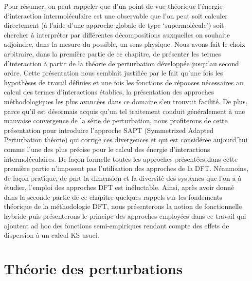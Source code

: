  
Pour résumer, on peut rappeler que d’un point de vue théorique l’énergie d’interaction intermoléculaire est une observable que l’on peut soit calculer directement (à l’aide d’une approche globale de type ‘supermolécule’) soit chercher à interpréter par différentes décompositions auxquelles on souhaite adjoindre, dans la mesure du possible, un sens physique. Nous avons fait le choix arbitraire, dans la première partie de ce chapitre, de présenter les termes d’interaction à partir de la théorie de perturbation développée jusqu’au second ordre. Cette présentation nous semblait justifiée par le fait qu’une fois les hypothèses de travail définies et une fois les fonctions de réponses nécessaires au calcul des termes d’interactions établies, la présentation des approches méthodologiques les plus avancées dans ce domaine s’en trouvait facilité. De plus, parce qu’il est désormais acquis qu’un tel traitement conduit généralement à une mauvaise convergence de la série de perturbation, nous profiterons de cette présentation pour introduire l’approche SAPT (Symmetrized Adapted Perturbation théorie) qui corrige ces divergences et qui est considérée aujourd’hui comme l’une des plus précise pour le calcul des énergie d’interactions intermoléculaires. 
De façon formelle toutes les approches présentées dans cette première partie n’imposent pas l’utilisation des approches de la DFT. Néanmoins, de façon pratique, de part la dimension et la diversité des systèmes que l’on a à étudier, l’emploi des approches DFT est inéluctable. Ainsi, après avoir donné dans la seconde partie de ce chapitre quelques rappels sur les fondements théorique de la méthodologie DFT, nous présenterons la notion de fonctionnelle hybride puis présenterons le principe des approches employées dans ce travail qui ajoutent ad hoc des fonctions semi-empiriques rendant compte des effets de dispersion à un calcul KS usuel.\\












\section[Théorie des perturbations]{Théorie des perturbations}

